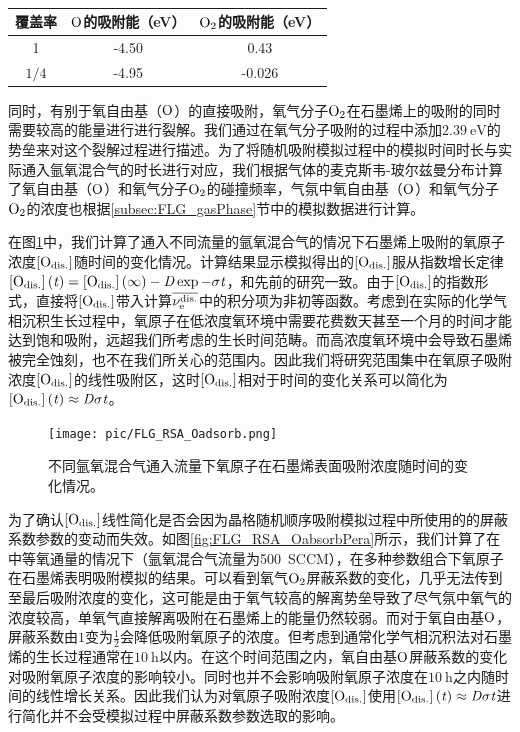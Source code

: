\begin{table}
    \centering
    \caption{}
    \begin{tabular}{ccc}
        \toprule
        覆盖率  & $\cemb{O}$的吸附能（\si{\electronvolt}） & $\cemb{O2}$的吸附能（\si{\electronvolt}） \\
        \midrule
        1       & -4.50                                    & 0.43                                      \\
        $1 / 4$ & -4.95                                    & -0.026                                    \\
        \bottomrule
    \end{tabular}
    \label{tab:FLG_RSA_coverage}
\end{table}

同时，有别于氧自由基（$\cemb{O}$）的直接吸附，氧气分子$\cemb{O2}$在石墨烯上的吸附的同时需要较高的能量进行进行裂解。我们通过在氧气分子吸附的过程中添加$\SI{2.39}{\electronvolt}$的势垒来对这个裂解过程进行描述。为了将随机吸附模拟过程中的模拟时间时长与实际通入氩氧混合气的时长进行对应，我们根据气体的麦克斯韦-玻尔兹曼分布计算了氧自由基（$\cemb{O}$）和氧气分子$\cemb{O2}$的碰撞频率，气氛中氧自由基（$\cemb{O}$）和氧气分子$\cemb{O2}$的浓度也根据\ref{subsec:FLG_gasPhase}节中的模拟数据进行计算。

在图\ref{fig:FLG_RSA_Oadsorb}中，我们计算了通入不同流量的氩氧混合气的情况下石墨烯上吸附的氧原子浓度$\rm{\left[O_{dis.}\right]} \it$随时间的变化情况。计算结果显示模拟得出的$\rm{\left[O_{dis.}\right]} \it$服从指数增长定律$\rm{\left[O_{dis.}\right]} \it\left(\it t\right)=\rm{\left[O_{dis.}\right]} \it\left(\it \infty \right)-\it D\exp{\it -\sigma t}$，和先前的研究一致。由于$\rm{\left[O_{dis.}\right]} \it$的指数形式，直接将$\rm{\left[O_{dis.}\right]} \it$带入计算$\overline{\nu_{\rm e}^{\rm dis.} \it}$中的积分项为非初等函数。考虑到在实际的化学气相沉积生长过程中，氧原子在低浓度氧环境中需要花费数天甚至一个月的时间才能达到饱和吸附，远超我们所考虑的生长时间范畴。而高浓度氧环境中会导致石墨烯被完全蚀刻，也不在我们所关心的范围内。因此我们将研究范围集中在氧原子吸附浓度$\rm{\left[O_{dis.}\right]} \it$的线性吸附区，这时$\rm{\left[O_{dis.}\right]} \it$相对于时间的变化关系可以简化为$\rm{\left[O_{dis.}\right]} \it\left(\it t\right)\approx \it D \sigma t$。

\begin{figure}[htb]
    \texttt{[image: pic/FLG\_RSA\_Oadsorb.png]}
    \caption{不同氩氧混合气通入流量下氧原子在石墨烯表面吸附浓度随时间的变化情况。}
    \label{fig:FLG_RSA_Oadsorb}
\end{figure}

为了确认$\rm{\left[O_{dis.}\right]} \it$线性简化是否会因为晶格随机顺序吸附模拟过程中所使用的的屏蔽系数参数的变动而失效。如图\ref{fig:FLG_RSA_OabsorbPera}所示，我们计算了在中等氧通量的情况下（氩氧混合气流量为\SI{500}{SCCM}），在多种参数组合下氧原子在石墨烯表明吸附模拟的结果。可以看到氧气$\cemb{O2}$屏蔽系数的变化，几乎无法传到至最后吸附浓度的变化，这可能是由于氧气较高的解离势垒导致了尽气氛中氧气的浓度较高，单氧气直接解离吸附在石墨烯上的能量仍然较弱。而对于氧自由基$\cemb{O}$，屏蔽系数由$1$变为$\frac{1}{2}$会降低吸附氧原子的浓度。但考虑到通常化学气相沉积法对石墨烯的生长过程通常在$\SI{10}{\hour}$以内。在这个时间范围之内，氧自由基$\cemb{O}$屏蔽系数的变化对吸附氧原子浓度的影响较小。同时也并不会影响吸附氧原子浓度在$\SI{10}{\hour}$之内随时间的线性增长关系。因此我们认为对氧原子吸附浓度$\rm{\left[O_{dis.}\right]} \it$使用$\rm{\left[O_{dis.}\right]} \it\left(\it t\right)\approx \it D \sigma t$进行简化并不会受模拟过程中屏蔽系数参数选取的影响。

